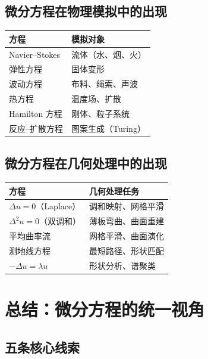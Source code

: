 \subsection{微分方程在物理模拟中的出现}

\begin{center}
\begin{tabular}{L{4cm}L{5cm}}
\toprule
\textbf{方程} & \textbf{模拟对象} \\
\midrule
Navier--Stokes & 流体（水、烟、火） \\
弹性方程 & 固体变形 \\
波动方程 & 布料、绳索、声波 \\
热方程 & 温度场、扩散 \\
Hamilton 方程 & 刚体、粒子系统 \\
反应--扩散方程 & 图案生成（Turing） \\
\bottomrule
\end{tabular}
\end{center}

\subsection{微分方程在几何处理中的出现}

\begin{center}
\begin{tabular}{L{4cm}L{5cm}}
\toprule
\textbf{方程} & \textbf{几何处理任务} \\
\midrule
$\Delta u = 0$（Laplace） & 调和映射、网格平滑 \\
$\Delta^2 u = 0$（双调和） & 薄板弯曲、曲面重建 \\
平均曲率流 & 网格平滑、曲面演化 \\
测地线方程 & 最短路径、形状匹配 \\
$-\Delta u = \lambda u$ & 形状分析、谱聚类 \\
\bottomrule
\end{tabular}
\end{center}

\section{总结：微分方程的统一视角}

\subsection{五条核心线索}

